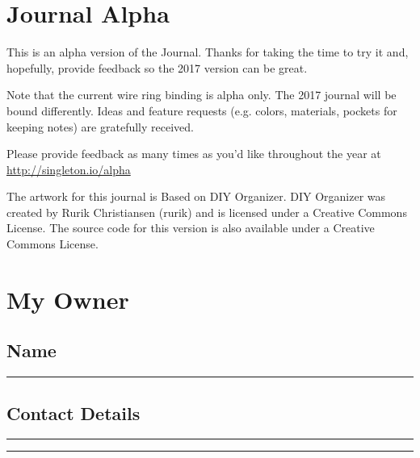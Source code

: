 \section{Journal Alpha}

This is an alpha version of the Journal.  Thanks for taking the time to try it and, hopefully, provide feedback so the 2017 version can be great.

Note that the current wire ring binding is alpha only.  The 2017 journal will be bound differently.  Ideas and feature requests (e.g. colors, materials, pockets for keeping notes) are gratefully received.

Please provide feedback as many times as you'd like throughout the year at \url{http://singleton.io/alpha}

The artwork for this journal is Based on DIY Organizer.  DIY Organizer was created by Rurik Christiansen (rurik) and is licensed under a Creative Commons License.  The source code for this version is also available under a Creative Commons License.

\section{My Owner}

\subsection{Name}
{\color{WriteBgMain}
\rule{\textwidth}{1pt}\par}

\subsection{Contact Details}
{\color{WriteBgMain}
\rule{\textwidth}{1pt}\par
\rule{\textwidth}{1pt}\par}

\pagebreak
\pagebreak
\pagebreak